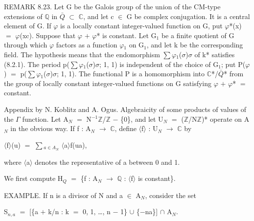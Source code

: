 \documentclass[10pt,twoside]{article}
\begin{document}
REMARK 8.23. Let G be the Galois group of the union of the CM-type extensions of \ensuremath{ℚ} in \ensuremath{\bar{Q}} \ensuremath{⊂} \ensuremath{ℂ}, and let c \ensuremath{∈} G be complex conjugation. It is a central element of G. If \ensuremath{φ} is a locally constant integer-valued function on G, put \ensuremath{φ}*(x) \ensuremath{=} \ensuremath{φ}(xc). Suppose that \ensuremath{φ} \ensuremath{+} \ensuremath{φ}* is constant. Let G\ensuremath{_{1}} be a finite quotient of G through which \ensuremath{φ} factors as a function \ensuremath{φ}\ensuremath{_{1}} on G\ensuremath{_{1}}, and let k be the corresponding field. The hypothesis means that the endomorphism \ensuremath{∑}\ensuremath{φ}\ensuremath{_{1}}(\ensuremath{σ})\ensuremath{σ} of k* satisfies (8.2.1). The period p(\ensuremath{∑}\ensuremath{φ}\ensuremath{_{1}}(\ensuremath{σ})\ensuremath{σ}; 1, 1) is independent of the choice of G\ensuremath{_{1}}; put P(\ensuremath{φ}) \ensuremath{=} p(\ensuremath{∑}\ensuremath{φ}\ensuremath{_{1}}(\ensuremath{σ})\ensuremath{σ}; 1, 1). The functional P is a homomorphism into \ensuremath{ℂ}*/\ensuremath{\bar{Q}}* from the group of locally constant integer-valued functions on G satisfying \ensuremath{φ} \ensuremath{+} \ensuremath{φ}* \ensuremath{=} constant.\par
Appendix by N. Koblitz and A. Ogus. Algebraicity of some products of values of the \ensuremath{Γ} function. Let A\ensuremath{_{N}} \ensuremath{=} N\ensuremath{^{-1}}\ensuremath{ℤ}/\ensuremath{ℤ} \ensuremath{−} \{0\}, and let U\ensuremath{_{N}} \ensuremath{=} (\ensuremath{ℤ}/N\ensuremath{ℤ})* operate on A\ensuremath{_{N}} in the obvious way. If f : A\ensuremath{_{N}} \ensuremath{→} \ensuremath{ℂ}, define \ensuremath{⟨}f\ensuremath{⟩} : U\ensuremath{_{N}} \ensuremath{→} \ensuremath{ℂ} by\par
\ensuremath{⟨}f\ensuremath{⟩}(u) \ensuremath{=} \ensuremath{∑}\ensuremath{_{a∈A_N}} \ensuremath{⟨}a\ensuremath{⟩}f(ua),\par
where \ensuremath{⟨}a\ensuremath{⟩} denotes the representative of a between 0 and 1.\par
We first compute H\ensuremath{_{Q}} \ensuremath{=} \{f : A\ensuremath{_{N}} \ensuremath{→} \ensuremath{ℚ} : \ensuremath{⟨}f\ensuremath{⟩} is constant\}.\par
EXAMPLE. If n is a divisor of N and a \ensuremath{∈} A\ensuremath{_{N}}, consider the set\par
S\ensuremath{_{n,a}} \ensuremath{=} [\{a \ensuremath{+} k/n : k \ensuremath{=} 0, 1, …, n \ensuremath{−} 1\} \ensuremath{∪} \{\ensuremath{−}na\}] \ensuremath{∩} A\ensuremath{_{N}}.\par
\end{document}
